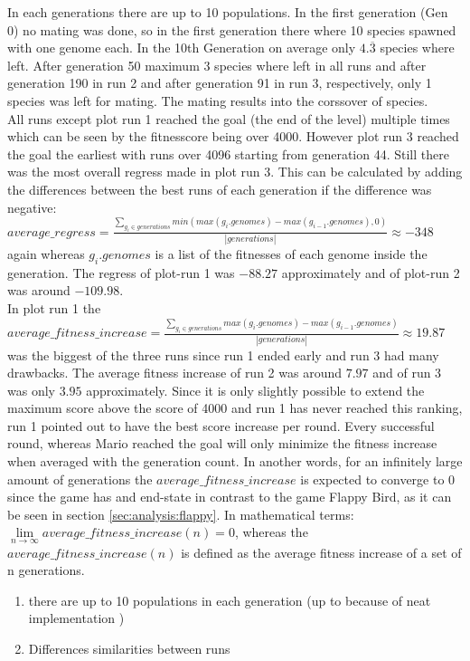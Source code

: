 			In each generations there are up to 10 populations. 
			In the first generation (Gen 0) no mating was done, so in the first generation there where 10 species spawned with one genome each. In the 10th Generation on average only $4.\overline{3}$ species where left. After generation 50 maximum 3 species where left in all runs and after generation 190 in run 2 and after generation 91 in run 3, respectively, only 1 species was left for mating. The mating results into the corssover of species.\\
			All runs except plot run 1 reached the goal (the end of the level) multiple times which can be seen by the fitnesscore being over 4000. However plot run 3 reached the goal the earliest with runs over 4096 starting from generation 44. Still there was the most overall regress made in plot run 3. This can be calculated by adding the differences between the best runs of each generation if the difference was negative: $average\_regress = \frac{\sum\nolimits_{g_i \in generations} min(max(g_i.genomes) - max(g_{i-1}.genomes), 0)}{|generations|}\approx-348$ again whereas $g_i.genomes$ is a list of the fitnesses of each genome inside the generation. The regress of plot-run 1 was $-88.27$ approximately and of plot-run 2 was around $-109.98$.\\
			In plot run 1 the $average\_fitness\_increase =  \frac{\sum\nolimits_{g_i \in generations} max(g_i.genomes) - max(g_{i-1}.genomes)}{|generations|}\approx19.87$ was the biggest of the three runs since run 1 ended early and run 3 had many drawbacks. The average fitness increase of run 2 was around $7.97$ and of run 3 was only $3.95$ approximately. Since it is only slightly possible to extend the maximum score above the score of 4000 and run 1 has never reached this ranking, run 1 pointed out to have the best score increase per round. Every successful round, whereas Mario reached the goal will only minimize the fitness increase when averaged with the generation count. In another words, for an infinitely large amount of generations the $average\_fitness\_increase$ is expected to converge to $0$ since the game has and end-state in contrast to the game Flappy Bird, as it can be seen in section \ref{sec:analysis:flappy}. In mathematical terms: $\lim\limits_{n \to \infty} average\_fitness\_increase(n) = 0$, whereas the $average\_fitness\_increase(n)$ is defined as the average fitness increase of a set of n generations.
			
			\begin{enumerate}
				\item there are up to 10 populations in each generation (up to because of neat implementation )
				\item Differences similarities between runs
			\end{enumerate}
		
